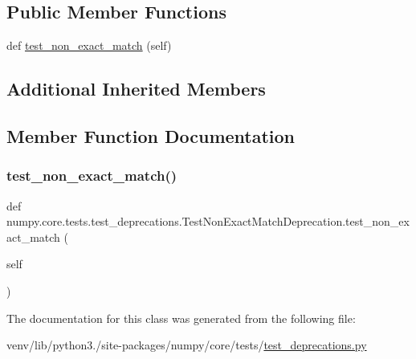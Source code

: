 \subsection*{Public Member Functions}
\begin{DoxyCompactItemize}
\item 
def \hyperlink{classnumpy_1_1core_1_1tests_1_1test__deprecations_1_1TestNonExactMatchDeprecation_a642aa3212a06cd2d67d2b202555e2c31}{test\+\_\+non\+\_\+exact\+\_\+match} (self)
\end{DoxyCompactItemize}
\subsection*{Additional Inherited Members}


\subsection{Member Function Documentation}
\mbox{\label{classnumpy_1_1core_1_1tests_1_1test__deprecations_1_1TestNonExactMatchDeprecation_a642aa3212a06cd2d67d2b202555e2c31}} 
\subsubsection{\texorpdfstring{test\+\_\+non\+\_\+exact\+\_\+match()}{test\_non\_exact\_match()}}
{\footnotesize\ttfamily def numpy.\+core.\+tests.\+test\+\_\+deprecations.\+Test\+Non\+Exact\+Match\+Deprecation.\+test\+\_\+non\+\_\+exact\+\_\+match (\begin{DoxyParamCaption}\item[{}]{self }\end{DoxyParamCaption})}



The documentation for this class was generated from the following file\+:\begin{DoxyCompactItemize}
\item 
venv/lib/python3./site-\/packages/numpy/core/tests/\hyperlink{core_2tests_2test__deprecations_8py}{test\+\_\+deprecations.\+py}\end{DoxyCompactItemize}
